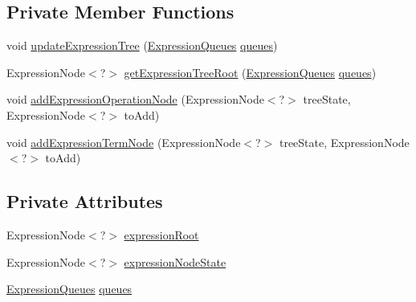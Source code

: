 \subsection*{Private Member Functions}
\begin{DoxyCompactItemize}
\item 
void \hyperlink{classit_1_1emarolab_1_1cagg_1_1core_1_1language_1_1syntax_1_1expressionTree_1_1ExpressionTreeGenerator_a33af243e09ff9fdafd10e8914c83009e}{update\-Expression\-Tree} (\hyperlink{classit_1_1emarolab_1_1cagg_1_1core_1_1language_1_1syntax_1_1expressionTree_1_1ExpressionTreeGenerator_1_1ExpressionQueues}{Expression\-Queues} \hyperlink{classit_1_1emarolab_1_1cagg_1_1core_1_1language_1_1syntax_1_1expressionTree_1_1ExpressionTreeGenerator_aac2440e0163b06ccef97c674673a2236}{queues})
\item 
Expression\-Node$<$?$>$ \hyperlink{classit_1_1emarolab_1_1cagg_1_1core_1_1language_1_1syntax_1_1expressionTree_1_1ExpressionTreeGenerator_a48a44d2a128486bc27d12bfebc8f1e74}{get\-Expression\-Tree\-Root} (\hyperlink{classit_1_1emarolab_1_1cagg_1_1core_1_1language_1_1syntax_1_1expressionTree_1_1ExpressionTreeGenerator_1_1ExpressionQueues}{Expression\-Queues} \hyperlink{classit_1_1emarolab_1_1cagg_1_1core_1_1language_1_1syntax_1_1expressionTree_1_1ExpressionTreeGenerator_aac2440e0163b06ccef97c674673a2236}{queues})
\item 
void \hyperlink{classit_1_1emarolab_1_1cagg_1_1core_1_1language_1_1syntax_1_1expressionTree_1_1ExpressionTreeGenerator_ada8f99d90f285293a859f96e09f8a018}{add\-Expression\-Operation\-Node} (Expression\-Node$<$?$>$ tree\-State, Expression\-Node$<$?$>$ to\-Add)
\item 
void \hyperlink{classit_1_1emarolab_1_1cagg_1_1core_1_1language_1_1syntax_1_1expressionTree_1_1ExpressionTreeGenerator_abe302754a71487c1ebd983adcf47e387}{add\-Expression\-Term\-Node} (Expression\-Node$<$?$>$ tree\-State, Expression\-Node$<$?$>$ to\-Add)
\end{DoxyCompactItemize}
\subsection*{Private Attributes}
\begin{DoxyCompactItemize}
\item 
Expression\-Node$<$?$>$ \hyperlink{classit_1_1emarolab_1_1cagg_1_1core_1_1language_1_1syntax_1_1expressionTree_1_1ExpressionTreeGenerator_a825ebea5e7e193aac64454b0876f4a52}{expression\-Root}
\item 
Expression\-Node$<$?$>$ \hyperlink{classit_1_1emarolab_1_1cagg_1_1core_1_1language_1_1syntax_1_1expressionTree_1_1ExpressionTreeGenerator_a32bbaf741ee244c0bfbf8f58119c52bd}{expression\-Node\-State}
\item 
\hyperlink{classit_1_1emarolab_1_1cagg_1_1core_1_1language_1_1syntax_1_1expressionTree_1_1ExpressionTreeGenerator_1_1ExpressionQueues}{Expression\-Queues} \hyperlink{classit_1_1emarolab_1_1cagg_1_1core_1_1language_1_1syntax_1_1expressionTree_1_1ExpressionTreeGenerator_aac2440e0163b06ccef97c674673a2236}{queues}
\end{DoxyCompactItemize}


